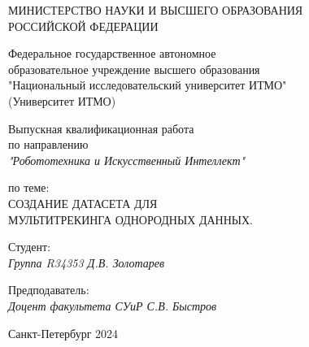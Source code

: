 \thispagestyle{empty}

\begin{center}
    МИНИСТЕРСТВО НАУКИ И ВЫСШЕГО ОБРАЗОВАНИЯ \\ РОССИЙСКОЙ ФЕДЕРАЦИИ

    \vspace{20pt}

    Федеральное государственное автономное \\ образовательное учреждение высшего образования \\
    "Национальный исследовательский университет ИТМО" \\
    (Университет ИТМО)

    \vspace{20pt}

\end{center}

\vfill

\begin{center}
    Выпускная квалификационная работа\\  
    по направлению\\
    \textit{"Робототехника и Искусственный Интеллект"}

    \vspace{20pt}

    по теме: \\
    \uppercase{Создание датасета для\\ мультитрекинга однородных данных.}
\end{center}
\vfill
\vfill

    \noindent Студент: \\
    \textit{Группа R34353 \hfill Д.В. Золотарев} 

    \vspace{20pt}

    \noindent Предподаватель: \\
    \textit{Доцент факультета СУиР \hfill С.В. Быстров}

\vfill

\begin{center}
    Санкт-Петербург 2024
\end{center}